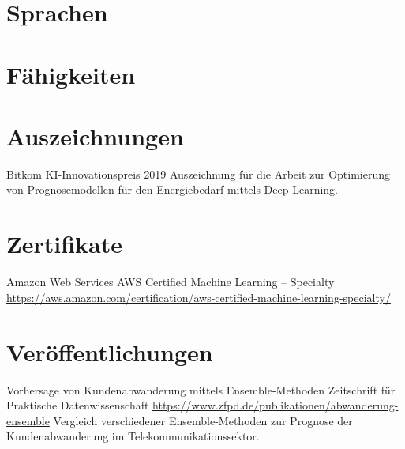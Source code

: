 \documentclass[a4paper, serif, 10pt]{moderncv}
\begin{document}
\section{Sprachen}

\section{Fähigkeiten}

\section{Auszeichnungen}

        {Bitkom}
        {KI-Innovationspreis 2019}
        {}
        {}
        {Auszeichnung für die Arbeit zur Optimierung von Prognosemodellen für den Energiebedarf mittels Deep Learning.}
\section{Zertifikate}

        {Amazon Web Services}
        {AWS Certified Machine Learning – Specialty}
        {\url{https://aws.amazon.com/certification/aws-certified-machine-learning-specialty/}}
        {}
        {}
\section{Veröffentlichungen}

        {Vorhersage von Kundenabwanderung mittels Ensemble-Methoden}
        {Zeitschrift für Praktische Datenwissenschaft}
        {\url{https://www.zfpd.de/publikationen/abwanderung-ensemble}}
        {}
        {Vergleich verschiedener Ensemble-Methoden zur Prognose der Kundenabwanderung im Telekommunikationssektor.}
\end{document}
